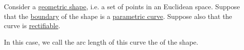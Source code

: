 \begin{definition}\label{def:perimeter}
  Consider a \hyperref[con:geometric_shape]{geometric shape}, i.e. a set of points in an Euclidean space. Suppose that the \hyperref[def:topological_boundary_operator]{boundary} of the shape is a \hyperref[def:parametric_curve]{parametric curve}. Suppose also that the curve is \hyperref[def:arc_length]{rectifiable}.

  In this case, we call the arc length of this curve the  of the shape.
\end{definition}
